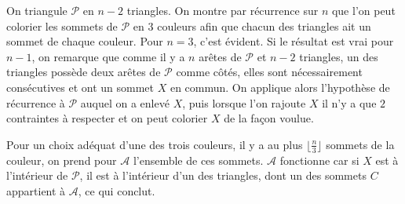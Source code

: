 \begin{sol}
On triangule $\mathcal{P}$ en $n-2$ triangles. On montre par récurrence sur $n$ que l'on peut colorier les sommets de $\mathcal{P}$ en $3$ couleurs afin que chacun des triangles ait un sommet de chaque couleur. Pour $n=3$, c'est évident. Si le résultat est vrai pour $n-1$, on remarque que comme il y a $n$ arêtes de $\mathcal{P}$ et $n-2$ triangles, un des triangles possède deux arêtes de $\mathcal{P}$ comme côtés, elles sont nécessairement consécutives et ont un sommet $X$ en commun. On applique alors l'hypothèse de récurrence à $\mathcal{P}$ auquel on a enlevé $X$, puis lorsque l'on rajoute $X$ il n'y a que $2$ contraintes à respecter et on peut colorier $X$ de la façon voulue.

Pour un choix adéquat d'une des trois couleurs, il y a au plus $\lfloor\frac n3\rfloor$ sommets de la couleur, on prend pour $\mathcal{A}$ l'ensemble de ces sommets. $\mathcal{A}$ fonctionne car si $X$ est à l'intérieur de $\mathcal{P}$, il est à l'intérieur d'un des triangles, dont un des sommets $C$ appartient à $\mathcal{A}$, ce qui conclut.
\end{sol}

